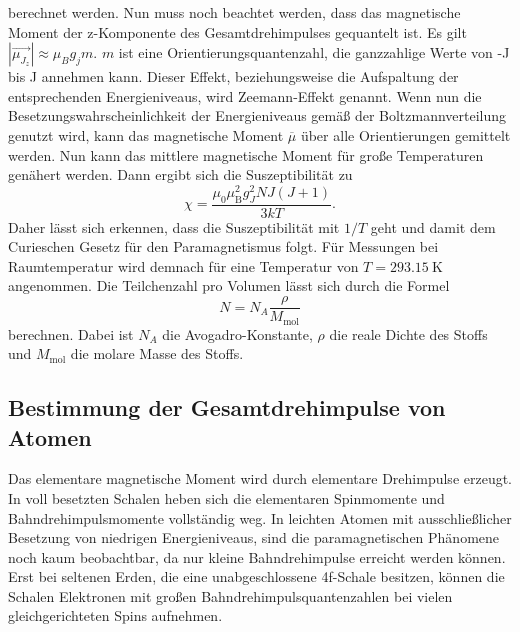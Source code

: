 berechnet werden.
Nun muss noch beachtet werden, dass das magnetische Moment der z-Komponente des Gesamtdrehimpulses gequantelt ist.
Es gilt $\left|\vec{\mu_{J_z}}\right| \approx \mu_B g_j m$. $m$ ist eine Orientierungsquantenzahl, die ganzzahlige Werte von -J bis J
annehmen kann. Dieser Effekt, beziehungsweise die Aufspaltung der entsprechenden Energieniveaus, wird Zeemann-Effekt genannt.
Wenn nun die Besetzungswahrscheinlichkeit der Energieniveaus gemäß der Boltzmannverteilung genutzt wird, kann das magnetische Moment $\overline{\mu}$ über
alle Orientierungen gemittelt werden. Nun kann das mittlere magnetische Moment für
große Temperaturen genähert werden. Dann ergibt sich die Suszeptibilität zu 
\begin{equation}
    \chi= \frac{\mu_0\mu_\text{B}^2g_J^2NJ(J+1)}{3kT}.
    \label{eq:chi}
\end{equation}
Daher lässt sich erkennen, dass die Suszeptibilität mit $1/T$ geht und damit dem Curieschen Gesetz für den Paramagnetismus folgt.
Für Messungen bei Raumtemperatur wird demnach für eine Temperatur von $T=\qty{293.15}{\kelvin}$ angenommen.
Die Teilchenzahl pro Volumen lässt sich durch die Formel
\begin{equation}
    N=N_A\frac{\rho}{M_\text{mol}}
    \label{eq:N}
\end{equation}
berechnen. Dabei ist $N_A$ die Avogadro-Konstante, $\rho$ die reale Dichte des Stoffs und $M_\text{mol}$ die molare Masse des Stoffs.
\subsection{Bestimmung der Gesamtdrehimpulse von Atomen }
Das elementare magnetische Moment wird durch elementare Drehimpulse erzeugt. In 
voll besetzten Schalen heben sich die elementaren Spinmomente und Bahndrehimpulsmomente vollständig weg.
In leichten Atomen mit ausschließlicher Besetzung von niedrigen Energieniveaus, sind die paramagnetischen
Phänomene noch kaum beobachtbar, da nur kleine Bahndrehimpulse erreicht werden können.
Erst bei seltenen Erden, die eine unabgeschlossene 4f-Schale besitzen, können die Schalen Elektronen mit
großen Bahndrehimpulsquantenzahlen bei vielen gleichgerichteten Spins aufnehmen.

